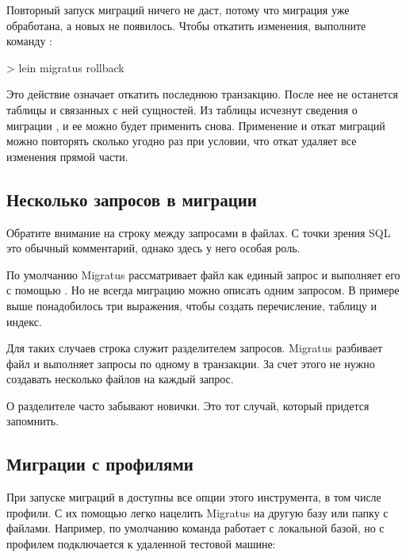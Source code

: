 Повторный запуск миграций ничего не даст, потому что миграция  уже обработана, а новых не появилось. Чтобы откатить изменения, выполните команду :

\begin{english}
  \begin{clojure}
> lein migratus rollback
  \end{clojure}
\end{english}

Это действие означает откатить последнюю транзакцию. После нее не останется таблицы  и связанных с ней сущностей. Из таблицы  исчезнут сведения о миграции , и ее можно будет применить снова. Применение и откат миграций можно повторять сколько угодно раз при условии, что откат удаляет все изменения прямой части.

\subsection{Несколько запросов в миграции}

Обратите внимание на строку \code{--;;} между запросами в файлах. С точки зрения SQL это обычный комментарий, однако здесь у него особая роль.

По умолчанию Migratus рассматривает файл как единый запрос и выполняет его с помощью . Но не всегда миграцию можно описать одним запросом. В примере выше понадобилось три выражения, чтобы создать перечисление, таблицу и индекс.

Для таких случаев строка \code{--;;} служит разделителем запросов. Migratus разбивает файл и выполняет запросы по одному в транзакции. За счет этого не нужно создавать несколько файлов на каждый запрос.

О разделителе часто забывают новички. Это тот случай, который придется запомнить.

\subsection{Миграции с профилями}

При запуске миграций в  доступны все опции этого инструмента, в том числе профили. С их помощью легко нацелить Migratus на другую базу или папку с файлами. Например, по умолчанию команда  работает с локальной базой, но с профилем  подключается к удаленной тестовой машине:


